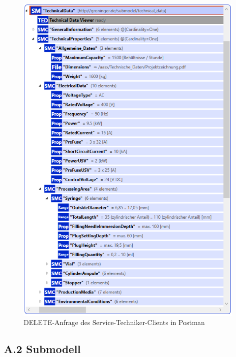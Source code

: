 \begin{figure}[htbp]
    \centering
        \includegraphics[width=1\textwidth]{Bilder/ErgebnissePackageExplorer/TehcnischeDaten.PNG}
    \caption{DELETE-Anfrage des Service-Techniker-Clients in Postman}
    \label{fig:KeycloakAnmeldeSeite}
\end{figure}


\subsection{A.2 Submodell}